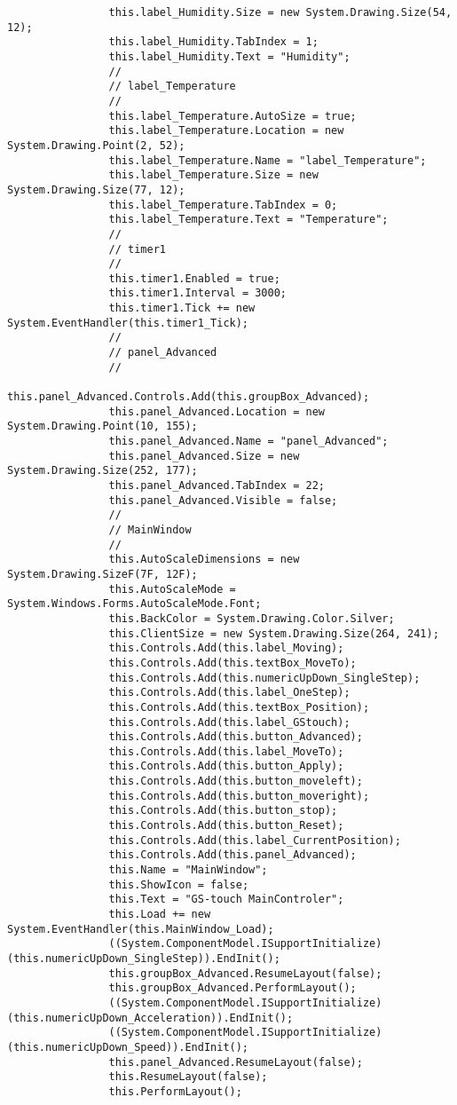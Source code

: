 \begin{lstlisting}
				this.label_Humidity.Size = new System.Drawing.Size(54, 12);
				this.label_Humidity.TabIndex = 1;
				this.label_Humidity.Text = "Humidity";
				// 
				// label_Temperature
				// 
				this.label_Temperature.AutoSize = true;
				this.label_Temperature.Location = new System.Drawing.Point(2, 52);
				this.label_Temperature.Name = "label_Temperature";
				this.label_Temperature.Size = new System.Drawing.Size(77, 12);
				this.label_Temperature.TabIndex = 0;
				this.label_Temperature.Text = "Temperature";
				// 
				// timer1
				// 
				this.timer1.Enabled = true;
				this.timer1.Interval = 3000;
				this.timer1.Tick += new System.EventHandler(this.timer1_Tick);
				// 
				// panel_Advanced
				// 
				this.panel_Advanced.Controls.Add(this.groupBox_Advanced);
				this.panel_Advanced.Location = new System.Drawing.Point(10, 155);
				this.panel_Advanced.Name = "panel_Advanced";
				this.panel_Advanced.Size = new System.Drawing.Size(252, 177);
				this.panel_Advanced.TabIndex = 22;
				this.panel_Advanced.Visible = false;
				// 
				// MainWindow
				// 
				this.AutoScaleDimensions = new System.Drawing.SizeF(7F, 12F);
				this.AutoScaleMode = System.Windows.Forms.AutoScaleMode.Font;
				this.BackColor = System.Drawing.Color.Silver;
				this.ClientSize = new System.Drawing.Size(264, 241);
				this.Controls.Add(this.label_Moving);
				this.Controls.Add(this.textBox_MoveTo);
				this.Controls.Add(this.numericUpDown_SingleStep);
				this.Controls.Add(this.label_OneStep);
				this.Controls.Add(this.textBox_Position);
				this.Controls.Add(this.label_GStouch);
				this.Controls.Add(this.button_Advanced);
				this.Controls.Add(this.label_MoveTo);
				this.Controls.Add(this.button_Apply);
				this.Controls.Add(this.button_moveleft);
				this.Controls.Add(this.button_moveright);
				this.Controls.Add(this.button_stop);
				this.Controls.Add(this.button_Reset);
				this.Controls.Add(this.label_CurrentPosition);
				this.Controls.Add(this.panel_Advanced);
				this.Name = "MainWindow";
				this.ShowIcon = false;
				this.Text = "GS-touch MainControler";
				this.Load += new System.EventHandler(this.MainWindow_Load);
				((System.ComponentModel.ISupportInitialize)(this.numericUpDown_SingleStep)).EndInit();
				this.groupBox_Advanced.ResumeLayout(false);
				this.groupBox_Advanced.PerformLayout();
				((System.ComponentModel.ISupportInitialize)(this.numericUpDown_Acceleration)).EndInit();
				((System.ComponentModel.ISupportInitialize)(this.numericUpDown_Speed)).EndInit();
				this.panel_Advanced.ResumeLayout(false);
				this.ResumeLayout(false);
				this.PerformLayout();
				

\end{lstlisting}
